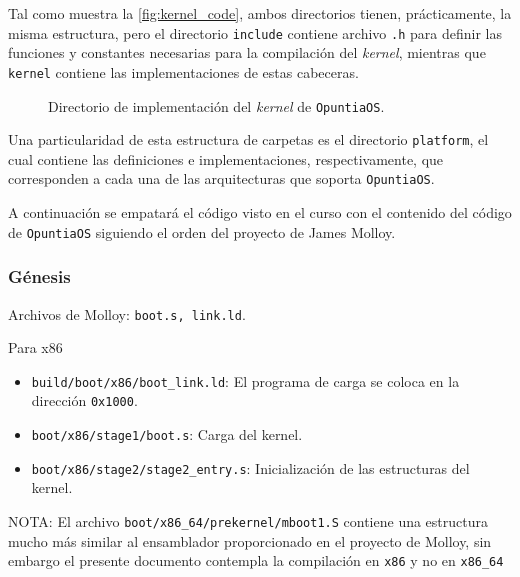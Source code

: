 	
	
	Tal como muestra la \autoref{fig:kernel_code}, ambos directorios tienen, prácticamente, la misma estructura, pero el directorio \texttt{include} contiene archivo \texttt{.h} para definir las funciones y constantes necesarias para la compilación del \textit{kernel}, mientras que \texttt{kernel} contiene las implementaciones de estas cabeceras.
	\begin{figure}[ht]
		\centering
		\hspace{3cm}
		\caption{
			Directorio de implementación del \textit{kernel} de \texttt{OpuntiaOS}.
			\label{fig:kernel_code}
		}
	\end{figure}

	
	
	Una particularidad de esta estructura de carpetas es el directorio \texttt{platform}, el cual contiene las definiciones e implementaciones, respectivamente, que corresponden a cada una de las arquitecturas que soporta \texttt{OpuntiaOS}.
	
	
	
	A continuación se empatará el código visto en el curso con el contenido del código de \texttt{OpuntiaOS} siguiendo el orden del proyecto de James Molloy.
	
	
	
	\clearpage
	\subsubsection{Génesis}
		Archivos de Molloy: \texttt{boot.s, link.ld}.
		
		Para x86
		\begin{itemize} \setlength\itemsep{0pt}
			\item \texttt{build/boot/x86/boot\_link.ld}: El programa de carga se coloca en la dirección \texttt{0x1000}.
			\item \texttt{boot/x86/stage1/boot.s}: Carga del kernel.
			\item \texttt{boot/x86/stage2/stage2\_entry.s}: Inicialización de las estructuras del kernel.
		\end{itemize}
	
		NOTA: El archivo \texttt{boot/x86\_64/prekernel/mboot1.S} contiene una estructura mucho más similar al ensamblador proporcionado en el proyecto de Molloy, sin embargo el presente documento contempla la compilación en \texttt{x86} y no en \texttt{x86\_64}
		

